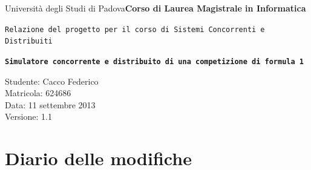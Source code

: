 \documentclass[a4paper,11pt, twoside]{book}
\begin{document}
  \thispagestyle{empty}
    
  \begin{flushright}
    {Università degli Studi di Padova}\linebreak[1]
    \textbf{Corso di Laurea \linebreak Magistrale in Informatica} \linebreak \linebreak \linebreak \linebreak
  \end{flushright}
  
  \begin{center}
    {\texttt{Relazione del progetto per il corso di Sistemi Concorrenti e Distribuiti \linebreak \linebreak \linebreak \linebreak \linebreak}}
  \end{center}
  
  \begin{center}
    \texttt{\huge{\textbf{Simulatore concorrente e distribuito di una competizione di formula 1}}} \linebreak \linebreak \linebreak \linebreak \linebreak \linebreak \linebreak \linebreak \linebreak
  \end{center}
  
  
  \begin{flushleft}
    Studente: Cacco Federico\\Matricola: 624686\\Data: 11 settembre 2013\\Versione: 1.1
  \end{flushleft}

  \newpage
  \setcounter{page}{1}
  
  \section*{Diario delle modifiche}
  
\end{document}

